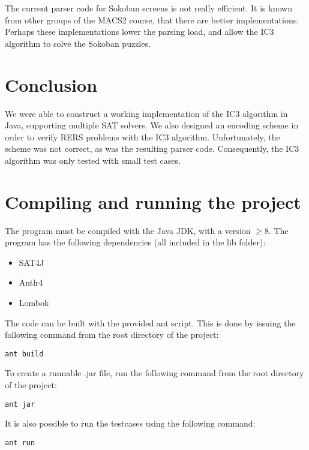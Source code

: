 \documentclass[a4paper]{article}
\begin{document}
The current parser code for Sokoban screens is not really efficient.
It is known from other groups of the MACS2 course, that there are better implementations. Perhaps these implementations lower the parsing load, and allow the IC3 algorithm to solve the Sokoban puzzles.

\section{Conclusion}
We were able to construct a working implementation of the IC3 algorithm in Java, supporting multiple SAT solvers. We also designed an encoding scheme in order to verify RERS problems with the IC3 algorithm. Unfortunately, the scheme was not correct, as was the resulting parser code. Consequently, the IC3 algorithm was only tested with small test cases.




\newpage
\appendix
\section{Compiling and running the project}
The program must be compiled with the Java JDK, with a version $\geq 8$. The program has the following dependencies (all included in the lib folder):
\begin{itemize}
\item SAT4J
\item Antlr4
\item Lombok
\end{itemize}

The code can be built with the provided ant script. This is done by issuing the following command from the root directory of the project:

\texttt{ant build}

To create a runnable .jar file, run the following command from the root directory of the project:

\texttt{ant jar}

It is also possible to run the testcases using the following command:

\texttt{ant run}
\end{document}

